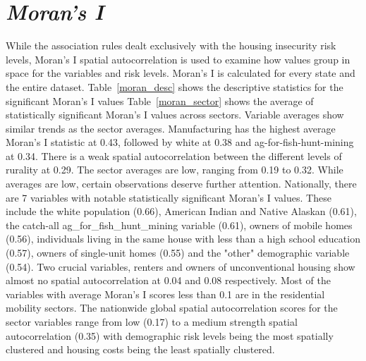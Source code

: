







\section{\textit{Moran's I}}

While the association rules dealt exclusively with the housing insecurity risk levels, Moran’s I spatial autocorrelation is used to examine how values group in space for the variables and risk levels. Moran’s I is calculated for every state and the entire dataset.  Table~\ref{moran_desc} shows the descriptive statistics for the significant Moran's I values
Table~\ref{moran_sector} shows the average of statistically significant Moran's I values across sectors. Variable averages show similar trends as the sector averages. Manufacturing has the highest average Moran's I statistic at 0.43, followed by white at 0.38 and ag-for-fish-hunt-mining at 0.34. There is a weak spatial autocorrelation between the different levels of rurality at 0.29. The sector averages are low, ranging from 0.19 to 0.32. While averages are low, certain observations deserve further attention. Nationally, there are 7 variables with notable statistically significant Moran's I values. These include the white population (0.66), American Indian and Native Alaskan (0.61), the catch-all ag\_for\_fish\_hunt\_mining variable (0.61), owners of mobile homes (0.56), individuals living in the same house with less than a high school education (0.57), owners of single-unit homes (0.55) and the "other" demographic variable (0.54). Two crucial variables, renters and owners of unconventional housing show almost no spatial autocorrelation at 0.04 and 0.08 respectively. Most of the variables with average Moran's I scores less than 0.1 are in the residential mobility sectors. The nationwide global spatial autocorrelation scores for the sector variables range from low (0.17) to a medium strength spatial autocorrelation (0.35) with demographic risk levels being the most spatially clustered and housing costs being the least spatially clustered.






%

